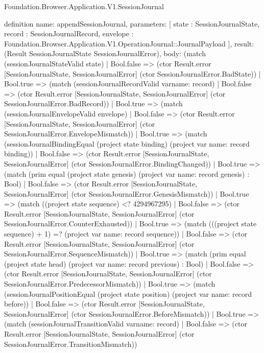 \begin{lexlean}{Foundation.Browser.Application.V1.SessionJournal}
\begin{semanticmodule}
definition{
  name: appendSessionJournal,
  parameters: [
    state : SessionJournalState,
    record : SessionJournalRecord,
    envelope : Foundation.Browser.Application.V1.OperationJournal::JournalPayload
  ],
  result: (Result SessionJournalState SessionJournalError),
  body: (match (sessionJournalStateValid state)
    | Bool.false => (ctor Result.error [SessionJournalState, SessionJournalError] (ctor SessionJournalError.BadState))
    | Bool.true => (match (sessionJournalRecordValid var{name: record})
      | Bool.false => (ctor Result.error [SessionJournalState, SessionJournalError] (ctor SessionJournalError.BadRecord))
      | Bool.true => (match (sessionJournalEnvelopeValid envelope)
        | Bool.false => (ctor Result.error [SessionJournalState, SessionJournalError] (ctor SessionJournalError.EnvelopeMismatch))
        | Bool.true => (match (sessionJournalBindingEqual (project state binding) (project var{
            name: record
          } binding))
          | Bool.false => (ctor Result.error [SessionJournalState, SessionJournalError] (ctor SessionJournalError.BindingChanged))
          | Bool.true => (match (prim equal (project state genesis) (project var{
              name: record
            } genesis) : Bool)
            | Bool.false => (ctor Result.error [SessionJournalState, SessionJournalError] (ctor SessionJournalError.GenesisMismatch))
            | Bool.true => (match ((project state sequence) <? 4294967295)
              | Bool.false => (ctor Result.error [SessionJournalState, SessionJournalError] (ctor SessionJournalError.CounterExhausted))
              | Bool.true => (match (((project state sequence) + 1) =? (project var{
                  name: record
                } sequence))
                | Bool.false => (ctor Result.error [SessionJournalState, SessionJournalError] (ctor SessionJournalError.SequenceMismatch))
                | Bool.true => (match (prim equal (project state head) (project var{
                    name: record
                  } previous) : Bool)
                  | Bool.false => (ctor Result.error [SessionJournalState, SessionJournalError] (ctor SessionJournalError.PredecessorMismatch))
                  | Bool.true => (match (sessionJournalPositionEqual (project state position) (project var{
                      name: record
                    } before))
                    | Bool.false => (ctor Result.error [SessionJournalState, SessionJournalError] (ctor SessionJournalError.BeforeMismatch))
                    | Bool.true => (match (sessionJournalTransitionValid var{name: record})
                      | Bool.false => (ctor Result.error [SessionJournalState, SessionJournalError] (ctor SessionJournalError.TransitionMismatch))
}
\end{semanticmodule}
\end{lexlean}
